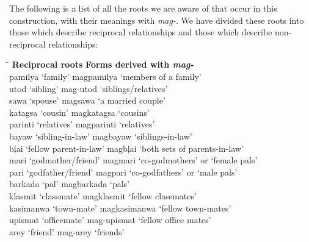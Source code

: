 The following is a list of all the roots we are aware of that occur in this construction, with their meanings with \textit{mag-}. We have divided these roots into those which describe reciprocal relationships and those which describe non-reciprocal relationships:

\ea
\begin{tabbing}
\hspace{4.3cm}    \=  \kill
\textbf{Reciprocal roots} \> \textbf{Forms derived with \textit{mag-} }\\
pamɪlya ‘family’ \> magpamɪlya ‘members of a family’ \\
utod ‘sibling’ \> mag{}-utod ‘siblings/relatives’ \\
sawa ‘spouse’ \> magsawa ‘a married couple’ \\
katagsa ‘cousin’ \> magkatagsa ‘cousins’ \\
parinti ‘relatives’ \> magparinti ‘relatives’ \\
bayaw ‘sibling-in-law’ \> magbayaw ‘siblings-in-law’ \\
bļai ‘fellow parent-in-law’ \> magbļai ‘both sets of parents-in-law’ \\
mari ‘godmother/friend’ \> magmari ‘co-godmothers’ or ‘female pals’ \\
pari ‘godfather/friend’ \> magpari ‘co-godfathers’ or ‘male pals’ \\
barkada ‘pal’ \> magbarkada ‘pals’ \\
klasmit ‘classmate’ \> magklasmit ‘fellow classmates’ \\
kasimanwa ‘town-mate’ \> magkasimanwa ‘fellow town-mates’ \\
upismat ‘officemate' \> mag-upismat ‘fellow office mates’ \\
arey ‘friend’ \> mag{}-arey ‘friends’
\end{tabbing}
\z

